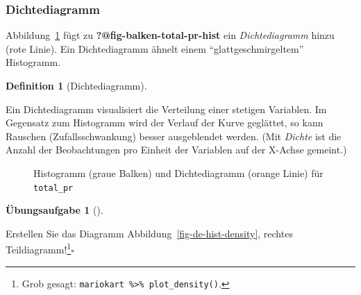 \documentclass[
  letterpaper,
]{scrbook}
\theoremstyle{definition}
\theoremstyle{definition}
\newtheorem{definition}{Definition}[chapter]
\theoremstyle{definition}
\newtheorem{exercise}{Übungsaufgabe}[chapter]
\theoremstyle{remark}
\begin{document}
\subsubsection{Dichtediagramm}\label{dichtediagramm}

Abbildung~\ref{fig-balken-total-pr-hist-dens} fügt zu
\textbf{?@fig-balken-total-pr-hist} ein \emph{Dichtediagramm} hinzu
(rote Linie). Ein Dichtediagramm ähnelt einem ``glattgeschmirgeltem''
Histogramm.

\begin{definition}[Dichtediagramm]\protect\hypertarget{def-dichtediagramm}{}\label{def-dichtediagramm}

Ein Dichtediagramm visualisiert die Verteilung einer stetigen Variablen.
Im Gegensatz zum Histogramm wird der Verlauf der Kurve geglättet, so
kann Rauschen (Zufallsschwankung) besser ausgeblendet werden. (Mit
\emph{Dichte} ist die Anzahl der Beobachtungen pro Einheit der Variablen
auf der X-Achse gemeint.)

\end{definition}

\begin{figure}


\caption{\label{fig-balken-total-pr-hist-dens}Histogramm (graue Balken)
und Dichtediagramm (orange Linie) für \texttt{total\_pr}}

\end{figure}%

\begin{exercise}[]\protect\hypertarget{exr-plot-density}{}\label{exr-plot-density}

Erstellen Sie das Diagramm Abbildung~\ref{fig-de-hist-density}, rechtes
Teildiagramm!\footnote{Grob gesagt:
  \texttt{mariokart\ \%\textgreater{}\%\ plot\_density()}.}\(\square\)

\end{exercise}
\end{document}
